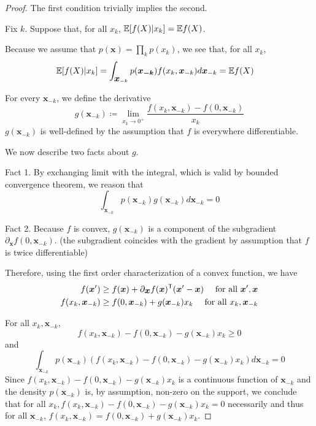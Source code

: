 \begin{proof}

The first condition trivially implies the second.

Fix $k$. Suppose that, for all $x_k$, ${\mathbb E}[ f(X) | x_k] = {\mathbb E} f(X)$. 

Because we assume that $p(\mathbf{x}) = \prod_k p(x_k)$, we see that, for all $x_k$,
\begin{align*}
 {\mathbb E}[ f(X) | x_k ] &=  \int_{\mbox{\boldmath $x$}_{-k}} p(\mbox{\boldmath $x_{-k}$}) f(x_k,\mbox{\boldmath $x$}_{-k}) d \mbox{\boldmath $x$}_{-k} = {\mathbb E} f(X)
\end{align*}


For every $\mathbf{x}_{-k}$, we define the derivative
\[
g(\mathbf{x}_{-k}) \coloneqq  \lim_{x_k \rightarrow 0^+} \frac{f(x_k, \mathbf{x}_{-k}) - f(0, \mathbf{x}_{-k})}{x_k}
\]
$g(\mathbf{x}_{-k})$ is well-defined by the assumption that $f$ is everywhere differentiable.

We now describe two facts about $g$.

Fact 1. By exchanging limit with the integral, which is valid by bounded convergence theorem, we reason that 
\[
\int_{\mathbf{x}_{-k}} p(\mathbf{x}_{-k}) g(\mathbf{x}_{-k}) d \mathbf{x}_{-k} = 0
\]

Fact 2. Because $f$ is convex, $g(\mathbf{x}_{-k})$ is a component of the subgradient $\partial_{\mathbf{x}} f(0, \mathbf{x}_{-k})$. (the subgradient coincides with the gradient by assumption that $f$ is twice differentiable)

Therefore, using the first order characterization of a convex function, we have
\begin{align*}
f(\mbox{\boldmath $x$}') &\geq f( \mbox{\boldmath $x$}) + \partial_{\mbox{\boldmath $x$}} f(\mbox{\boldmath $x$})^{\mathsf{T}} (\mbox{\boldmath $x$}' - \mbox{\boldmath $x$}) \quad \textrm{ for all } \mbox{\boldmath $x$}', \mbox{\boldmath $x$} \\
f(x_k, \mbox{\boldmath $x$}_{-k}) &\geq f(0, \mbox{\boldmath $x$}_{-k}) + g(\mbox{\boldmath $x$}_{-k}) x_k \quad \textrm{ for all } x_k, \mbox{\boldmath $x$}_{-k}
\end{align*}


For all $x_k, \mathbf{x}_{-k}$, 
\[
f(x_k, \mathbf{x}_{-k}) - f(0, \mathbf{x}_{-k}) - g(\mathbf{x}_{-k}) x_k \geq 0
\]
and
\[
\int_{\mathbf{x}_{-k}} p(\mathbf{x}_{-k}) (f(x_k, \mathbf{x}_{-k}) - f(0, \mathbf{x}_{-k}) - g(\mathbf{x}_{-k}) x_k) d\mathbf{x}_{-k} = 0
\]
Since $f(x_k, \mathbf{x}_{-k}) - f(0, \mathbf{x}_{-k}) - g(\mathbf{x}_{-k}) x_k$ is a continuous function of $\mathbf{x}_{-k}$ and the density $p(\mathbf{x}_{-k})$ is, by assumption, non-zero on the support, we conclude that for all $x_k, f(x_k, \mathbf{x}_{-k}) - f(0, \mathbf{x}_{-k}) - g(\mathbf{x}_{-k}) x_k =0 $ necessarily and thus for all $\mathbf{x}_{-k}$, $f(x_k, \mathbf{x}_{-k}) = f(0, \mathbf{x}_{-k}) + g(\mathbf{x}_{-k}) x_k$.


\end{proof}
